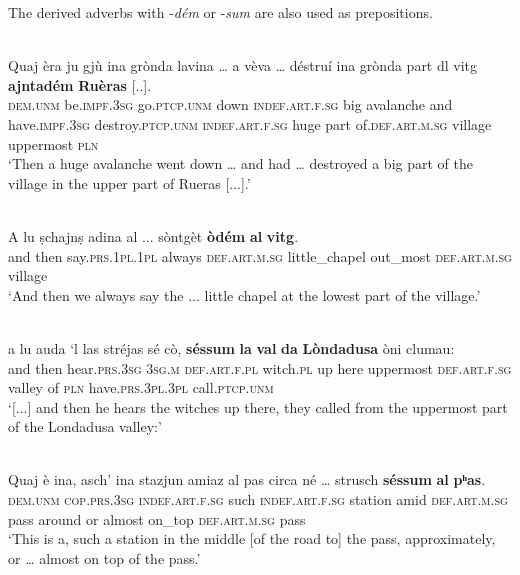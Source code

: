 The derived adverbs with -\textit{dém} or -\textit{sum} are also used as prepositions.

\ea
\label{}
\\
\gll    Quaj èra ju gjù ina grònda lavina … a vèva … déstruí ina grònda part dl vitg \textbf{ajntadém} \textbf{Ruèras} [..].\\
\textsc{dem.unm} be.\textsc{impf.3sg} go.\textsc{ptcp.unm} down \textsc{indef.art.f.sg} big avalanche {} and have.\textsc{impf.3sg} {} destroy.\textsc{ptcp.unm} \textsc{indef.art.f.sg} huge part of.\textsc{def.art.m.sg} village uppermost \textsc{pln}\\
\glt `Then a huge avalanche went down … and had … destroyed a big part of the village in the upper part of Rueras [...].'
\z

\ea
\label{}
\\
\gll A lu ṣchajnṣ adina al ... sòntgèt \textbf{òdém} \textbf{al} \textbf{vitg}.\\
and then say.\textsc{prs.1pl.1pl} always \textsc{def.art.m.sg} {} little\_chapel out\_most \textsc{def.art.m.sg} village\\
\glt `And then we always say the ... little chapel at the lowest part of the village.'
\z

\ea
\label{}
\\
\gll    [...] a lu auda `l las stréjas sé cò, \textbf{séssum} \textbf{la} \textbf{val} \textbf{da} \textbf{Lòndadusa} òni clumau:\\
{} and then hear.\textsc{prs.3sg} \textsc{3sg.m} \textsc{def.art.f.pl} witch.\textsc{pl} up here uppermost \textsc{def.art.f.sg} valley of \textsc{pln} have.\textsc{prs.3pl.3pl} call.\textsc{ptcp.unm}\\
\glt `[...] and then he hears the witches up there, they called from the uppermost part of the Londadusa valley:'
\z

\ea
\label{}
\\
\gll Quaj è ina, asch’ ina stazjun amiaz al pas circa né … strusch \textbf{séssum} \textbf{al} \textbf{pʰas}.   \\
\textsc{dem.unm} \textsc{cop.prs.3sg} \textsc{indef.art.f.sg} such \textsc{indef.art.f.sg} station amid \textsc{def.art.m.sg} pass around or {} almost on\_top \textsc{def.art.m.sg} pass\\
\glt `This is a, such a station in the middle [of the road to] the pass, approximately, or … almost on top of the pass.'
\z

